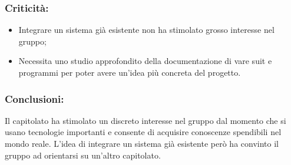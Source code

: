 		\subsubsection{Criticità:}
			\begin{itemize}
				\item Integrare un sistema già esistente non ha stimolato grosso interesse nel gruppo;
				\item Necessita uno studio approfondito della documentazione di vare suit e programmi per poter avere un'idea più concreta del progetto.
			\end{itemize}

		\subsubsection{Conclusioni:}
			Il capitolato ha stimolato un discreto interesse nel gruppo dal momento che si usano tecnologie importanti e consente di acquisire conoscenze spendibili nel mondo reale. L'idea di integrare un sistema già esistente però ha convinto il gruppo ad orientarsi su un'altro capitolato.
